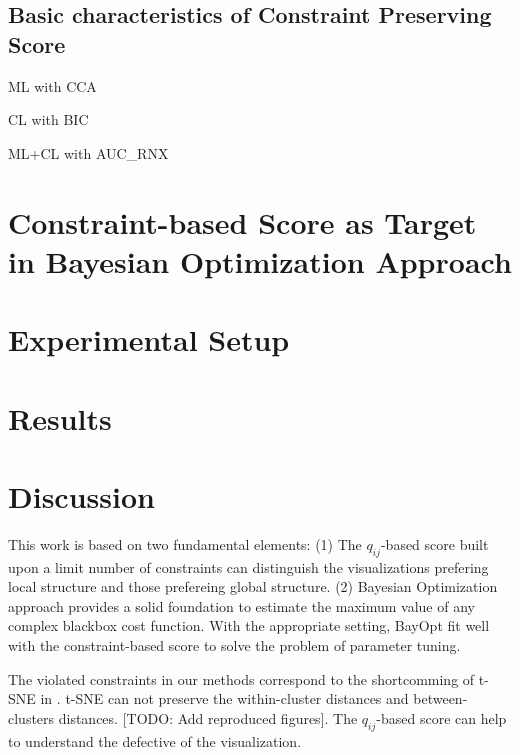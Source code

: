 \subsection{Basic characteristics of Constraint Preserving Score}

\par ML with CCA
\par CL with BIC
\par ML+CL with AUC\_RNX


\section{Constraint-based Score as Target in Bayesian Optimization Approach}



\section{Experimental Setup}



\section{Results}



\section{Discussion}

This work is based on two fundamental elements:
(1) The $q_{ij}$-based score built upon a limit number of constraints can distinguish the visualizations prefering local structure and those prefereing global structure.
(2) Bayesian Optimization approach provides a solid foundation to estimate the maximum value of any complex blackbox cost function.
With the appropriate setting, BayOpt fit well with the constraint-based score to solve the problem of parameter tuning.

\par
The violated constraints in our methods correspond to the shortcomming of t-SNE in \cite{wattenberg2016use}.
t-SNE can not preserve the within-cluster distances and between-clusters distances.
[TODO: Add reproduced figures].
The $q_{ij}$-based score can help to understand the defective of the visualization.

